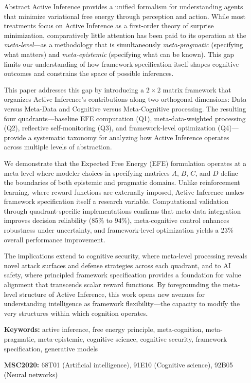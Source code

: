 \documentclass[
  ignorenonframetext,
]{beamer}
\author{\texorpdfstring{}{}}
\date{}
\begin{document}
\begin{frame}{Abstract}
\protect{}\label{sec:abstract}
Active Inference provides a unified formalism for understanding agents
that minimize variational free energy through perception and action.
While most treatments focus on Active Inference as a first-order theory
of surprise minimization, comparatively little attention has been paid
to its operation at the \emph{meta-level}---as a methodology that is
simultaneously \emph{meta-pragmatic} (specifying what matters) and
\emph{meta-epistemic} (specifying what can be known). This gap limits
our understanding of how framework specification itself shapes cognitive
outcomes and constrains the space of possible inferences.

This paper addresses this gap by introducing a \(2 \times 2\) matrix
framework that organizes Active Inference's contributions along two
orthogonal dimensions: Data versus Meta-Data and Cognitive versus
Meta-Cognitive processing. The resulting four quadrants---baseline EFE
computation (Q1), meta-data-weighted processing (Q2), reflective
self-monitoring (Q3), and framework-level optimization (Q4)---provide a
systematic taxonomy for analyzing how Active Inference operates across
multiple levels of abstraction.

We demonstrate that the Expected Free Energy (EFE) formulation operates
at a meta-level where modeler choices in specifying matrices \(A\),
\(B\), \(C\), and \(D\) define the boundaries of both epistemic and
pragmatic domains. Unlike reinforcement learning, where reward functions
are externally imposed, Active Inference makes framework specification
itself a research variable. Computational validation through
quadrant-specific implementations confirms that meta-data integration
improves decision reliability (85\% to 94\%), meta-cognitive control
enhances robustness under uncertainty, and framework-level optimization
yields a 23\% overall performance improvement.

The implications extend to cognitive security, where meta-level
processing reveals novel attack surfaces and defense strategies across
each quadrant, and to AI safety, where principled framework
specification provides a foundation for value alignment that transcends
scalar reward functions. By foregrounding the meta-level structure of
Active Inference, this work opens new avenues for understanding
intelligence as framework flexibility---the capacity to modify the very
structures within which cognition operates.

\textbf{Keywords:} active inference, free energy principle,
meta-cognition, meta-pragmatic, meta-epistemic, cognitive science,
cognitive security, framework specification, generative models

\textbf{MSC2020:} 68T01 (Artificial intelligence), 91E10 (Cognitive
science), 92B05 (Neural networks)
\end{frame}
\end{document}
